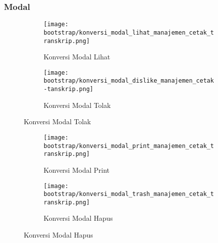 \subsubsection{Modal}
\begin{figure}	
	\centering
	\begin{subfigure}[t]{3in}
		\centering  
		\texttt{[image: bootstrap/konversi\_modal\_lihat\_manajemen\_cetak\_transkrip.png]}
		\caption{Konversi Modal Lihat} 
	\end{subfigure}
	\quad
	\begin{subfigure}[t]{3in}
		\centering  
		\texttt{[image: bootstrap/konversi\_modal\_dislike\_manajemen\_cetak-tanskrip.png]}
		\caption{Konversi Modal Tolak} 
	\end{subfigure}
\end{figure}
\begin{figure}	
	\centering
	\begin{subfigure}[t]{3in}
		\centering  
		\texttt{[image: bootstrap/konversi\_modal\_print\_manajemen\_cetak\_transkrip.png]}
		\caption{Konversi Modal Print} 
	\end{subfigure}
	\quad
	\begin{subfigure}[t]{3in}
		\centering  
		\texttt{[image: bootstrap/konversi\_modal\_trash\_manajemen\_cetak\_transkrip.png]}
		\caption{Konversi Modal Hapus} 
	\end{subfigure}
\end{figure}

